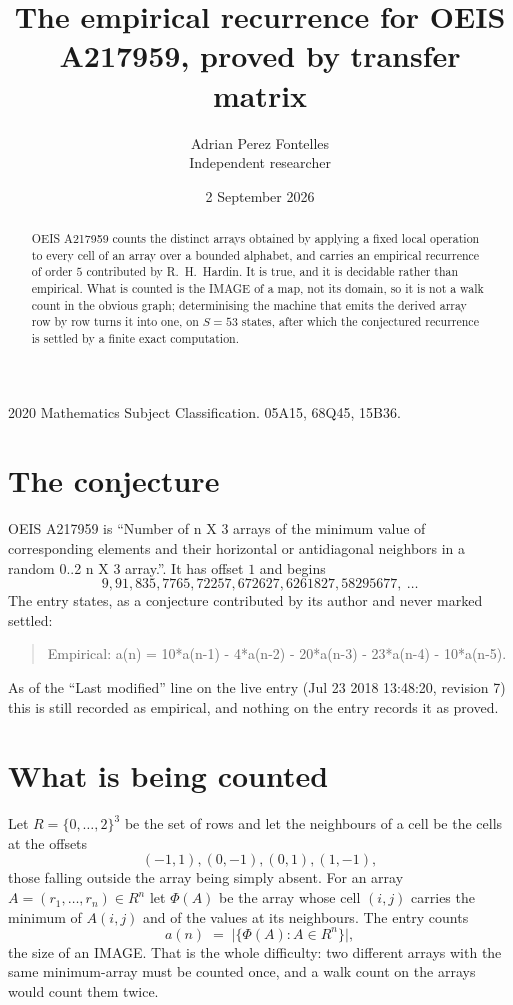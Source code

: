 \documentclass[11pt,a4paper]{article}
\title{The empirical recurrence for OEIS A217959, proved by transfer matrix}
\author{Adrian Perez Fontelles\\ \small Independent researcher}
\date{2 September 2026}
\theoremstyle{plain}
\theoremstyle{definition}
\begin{document}
\maketitle

\begin{abstract}
OEIS A217959 counts the distinct arrays obtained by applying a fixed local operation to every cell
of an array over a bounded alphabet, and carries an empirical recurrence of order $5$
contributed by R.~H.~Hardin. It is true, and it is decidable rather than empirical. What is
counted is the IMAGE of a map, not its domain, so it is not a walk count in the obvious graph;
determinising the machine that emits the derived array row by row turns it into one, on
$S=53$ states, after which the conjectured recurrence is settled by a finite exact
computation.
\end{abstract}

\noindent\small 2020 Mathematics Subject Classification. 05A15, 68Q45, 15B36.\normalsize

\section{The conjecture}

OEIS A217959 is ``Number of n X 3 arrays of the minimum value of corresponding elements and their horizontal or antidiagonal neighbors in a random 0..2 n X 3 array.''. It has offset $1$ and begins
\[
9, 91, 835, 7765, 72257, 672627, 6261827, 58295677,\ \dots
\]
The entry states, as a conjecture contributed by its author and never marked settled:
\begin{quote}
Empirical: a(n) = 10*a(n-1) - 4*a(n-2) - 20*a(n-3) - 23*a(n-4) - 10*a(n-5).
\end{quote}
As of the ``Last modified'' line on the live entry (Jul 23 2018 13:48:20, revision 7) this is still
recorded as empirical, and nothing on the entry records it as proved.

\section{What is being counted}

Let $R=\{0,\dots,2\}^{3}$ be the set of rows and let the neighbours of
a cell be the cells at the offsets
\[
(-1,1), (0,-1), (0,1), (1,-1),
\]
those falling outside the array being simply absent. For an array
$A=(r_1,\dots,r_n)\in R^n$ let $\Phi(A)$ be the array whose cell $(i,j)$ carries the
minimum of $A(i,j)$ and of the values at its neighbours. The entry counts
\[
a(n)\;=\;\bigl|\{\Phi(A):A\in R^n\}\bigr| ,
\]
the size of an IMAGE. That is the whole difficulty: two different arrays with the same
minimum-array must be counted once, and a walk count on the arrays would count them twice.
\end{document}
